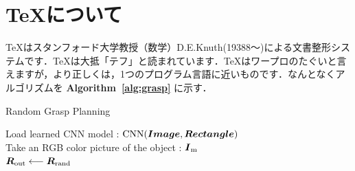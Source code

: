 \documentclass[twocolumn,10pt]{jarticle}
\begin{document}
\section{\TeX について}
TeXはスタンフォード大学教授（数学）D.E.Knuth(19388～)による文書整形システムです．TeXは大抵「テフ」と読まれています．TeXはワープロのたぐいと言えますが，より正しくは，1つのプログラム言語に近いものです．なんとなくアルゴリズムを {\bf Algorithm~\ref{alg:grasp}} に示す．
\begin{spacing}{0.99}
\begin{algorithm}[htbp]
\caption{Random Grasp Planning}
\label{alg:grasp}
\nl Load learned CNN model : ${\rm CNN}(\mbox{\boldmath{$Image$}},\mbox{\boldmath{$Rectangle$}})$\\
\nl Take an RGB color picture of the object : $\mbox{\boldmath{$I$}}_{\rm m}$\\
\nl{}
\nl $\mbox{\boldmath{$R$}}_{\rm out} \longleftarrow \mbox{\boldmath{$R$}}_{\rm rand}$\\
\end{algorithm}
\end{spacing}
\vspace{-10mm}
\end{document}
